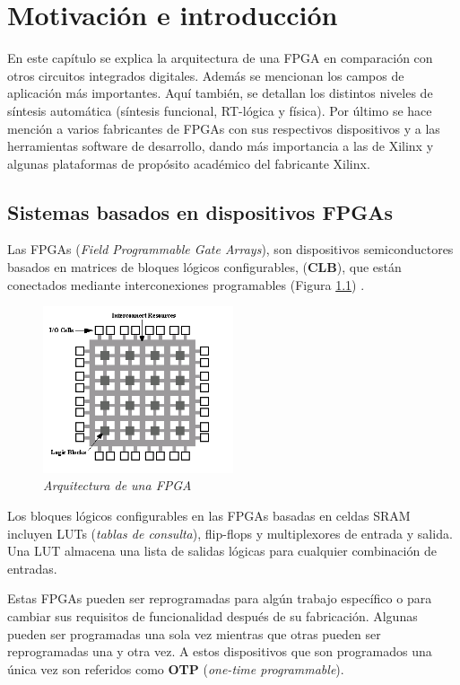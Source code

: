 \chapter{Motivación e introducción}

En este capítulo se explica la arquitectura de una FPGA en comparación con otros circuitos integrados digitales. Además se mencionan los campos de aplicación más 
importantes. Aquí también, se detallan los distintos niveles de síntesis automática (síntesis funcional, RT-lógica y física). 
Por último se hace mención a varios fabricantes de FPGAs con sus respectivos dispositivos y a las herramientas software de desarrollo, 
dando más importancia a las de Xilinx y algunas plataformas de propósito académico del fabricante Xilinx.

\section{Sistemas basados en dispositivos FPGAs} 

Las FPGAs (\textit{Field Programmable Gate Arrays}), son dispositivos semiconductores basados en matrices de bloques lógicos configurables,
(\textbf{CLB}), que están conectados mediante interconexiones programables (Figura \ref{arqFPGA}) \cite{fpga_xilinx}. 

\begin{figure}[H]
    \centering
    \includegraphics[width = 0.5\textwidth]{imagenes/arqFPGA.png}
    \caption{\textit{Arquitectura de una FPGA \cite{arquitectura}}}\label{arqFPGA}
\end{figure}

Los bloques lógicos configurables en las FPGAs basadas en celdas SRAM incluyen LUTs (\textit{tablas de consulta}), flip-flops y 
multiplexores de entrada y salida. Una LUT almacena una lista de salidas lógicas para cualquier combinación de entradas.

Estas FPGAs pueden ser reprogramadas para algún trabajo específico o para cambiar sus requisitos de funcionalidad después de su 
fabricación. Algunas pueden ser programadas una sola vez mientras que otras pueden ser reprogramadas una y otra vez. A estos 
dispositivos que son programados una única vez son referidos como \textbf{OTP} (\textit{one-time programmable}).

